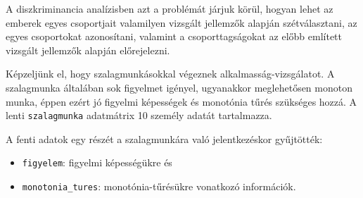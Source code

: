 \documentclass[
  letterpaper,
]{krantz}
\makeatletter
\newenvironment{Shaded}{\begin{snugshade}}{\end{snugshade}}
\newcommand{\AttributeTok}[1]{\textcolor[rgb]{0.40,0.45,0.13}{#1}}
\newcommand{\CommentTok}[1]{\textcolor[rgb]{0.37,0.37,0.37}{#1}}
\newcommand{\FunctionTok}[1]{\textcolor[rgb]{0.28,0.35,0.67}{#1}}
\newcommand{\NormalTok}[1]{\textcolor[rgb]{0.00,0.23,0.31}{#1}}
\newcommand{\OtherTok}[1]{\textcolor[rgb]{0.00,0.23,0.31}{#1}}
\newcommand{\SpecialCharTok}[1]{\textcolor[rgb]{0.37,0.37,0.37}{#1}}
\newcommand{\StringTok}[1]{\textcolor[rgb]{0.13,0.47,0.30}{#1}}
\providecommand{\tightlist}{%
  \setlength{\itemsep}{0pt}\setlength{\parskip}{0pt}}\usepackage{longtable,booktabs,array}
\newenvironment{kframe}{%
\medskip{}
\setlength{\fboxsep}{.8em}
 \def\at@end@of@kframe{}%
 \ifinner\ifhmode%
  \def\at@end@of@kframe{\end{minipage}}%
  \begin{minipage}{\columnwidth}%
 \fi\fi%
 \def\FrameCommand##1{\hskip\@totalleftmargin \hskip-\fboxsep
 \colorbox{shadecolor}{##1}\hskip-\fboxsep
     \hskip-\linewidth \hskip-\@totalleftmargin \hskip\columnwidth}%
 \MakeFramed {\advance\hsize-\width
   \@totalleftmargin\z@ \linewidth\hsize
   \@setminipage}}%
 {\par\unskip\endMakeFramed%
 \at@end@of@kframe}
\renewenvironment{Shaded}{\begin{kframe}}{\end{kframe}}
\makeatother
\begin{document}
A diszkriminancia analízisben azt a problémát járjuk körül, hogyan lehet
az emberek egyes csoportjait valamilyen vizsgált jellemzők alapján
szétválasztani, az egyes csoportokat azonosítani, valamint a
csoporttagságokat az előbb említett vizsgált jellemzők alapján
előrejelezni.

Képzeljünk el, hogy szalagmunkásokkal végeznek alkalmasság-vizsgálatot.
A szalagmunka általában sok figyelmet igényel, ugyanakkor meglehetősen
monoton munka, éppen ezért jó figyelmi képességek és monotónia tűrés
szükséges hozzá. A lenti \texttt{szalagmunka} adatmátrix 10 személy
adatát tartalmazza.

\begin{Shaded}
\end{Shaded}

A fenti adatok egy részét a szalagmunkára való jelentkezéskor
gyűjtötték:

\begin{itemize}
\tightlist
\item
  \texttt{figyelem}: figyelmi képességükre és
\item
  \texttt{monotonia\_tures}: monotónia-tűrésükre vonatkozó információk.
\end{itemize}
\end{document}
